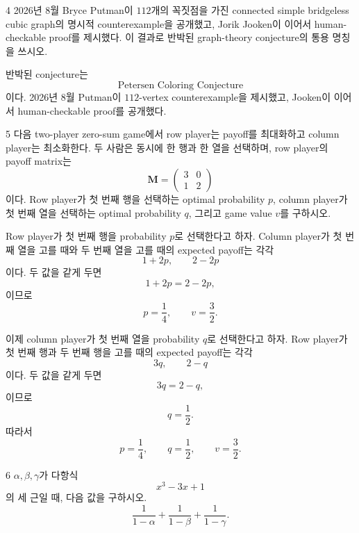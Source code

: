 \begin{problem}{4}
2026년 8월 Bryce Putman이 $112$개의 꼭짓점을 가진 connected simple bridgeless cubic graph의 명시적 counterexample을 공개했고, Jorik Jooken이 이어서 human-checkable proof를 제시했다. 이 결과로 반박된 graph-theory conjecture의 통용 명칭을 쓰시오.
\end{problem}

\begin{solution}
반박된 conjecture는
\[
    \boxed{\text{Petersen Coloring Conjecture}}
\]
이다. 2026년 8월 Putman이 $112$-vertex counterexample을 제시했고, Jooken이 이어서 human-checkable proof를 공개했다.
\end{solution}

\begin{problem}{5}
다음 two-player zero-sum game에서 row player는 payoff를 최대화하고 column player는 최소화한다. 두 사람은 동시에 한 행과 한 열을 선택하며, row player의 payoff matrix는
\[
    \mathbf{M}
    =
    \begin{pmatrix}
        3&0\\
        1&2
    \end{pmatrix}
\]
이다. Row player가 첫 번째 행을 선택하는 optimal probability $p$, column player가 첫 번째 열을 선택하는 optimal probability $q$, 그리고 game value $v$를 구하시오.
\end{problem}

\begin{solution}
Row player가 첫 번째 행을 probability $p$로 선택한다고 하자. Column player가 첫 번째 열을 고를 때와 두 번째 열을 고를 때의 expected payoff는 각각
\[
    1+2p,
    \qquad
    2-2p
\]
이다. 두 값을 같게 두면
\[
    1+2p=2-2p,
\]
이므로
\[
    p=\frac14,
    \qquad
    v=\frac32.
\]

이제 column player가 첫 번째 열을 probability $q$로 선택한다고 하자. Row player가 첫 번째 행과 두 번째 행을 고를 때의 expected payoff는 각각
\[
    3q,
    \qquad
    2-q
\]
이다. 두 값을 같게 두면
\[
    3q=2-q,
\]
이므로
\[
    q=\frac12.
\]
따라서
\[
    \boxed{
        p=\frac14,
        \qquad
        q=\frac12,
        \qquad
        v=\frac32
    }.
\]
\end{solution}

\begin{problem}{6}
$\alpha,\beta,\gamma$가 다항식
\[
    x^3-3x+1
\]
의 세 근일 때, 다음 값을 구하시오.
\[
    \frac{1}{1-\alpha}
    +\frac{1}{1-\beta}
    +\frac{1}{1-\gamma}.
\]
\end{problem}

